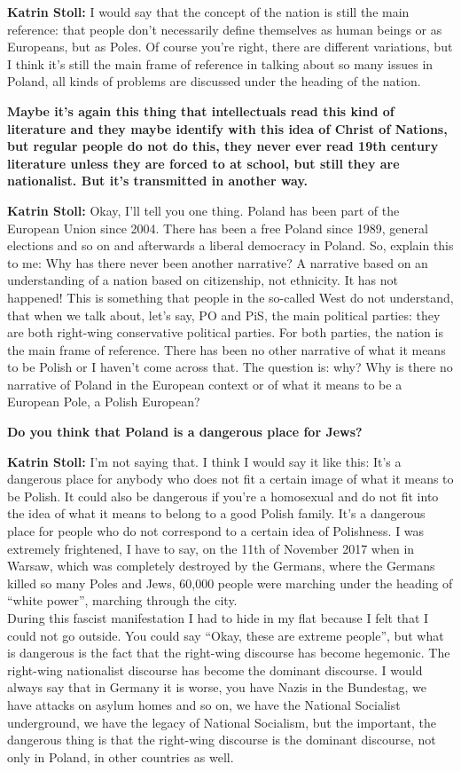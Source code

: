 \textbf{Katrin Stoll:} I would say that the concept of the nation is still the main reference: that people don’t necessarily define themselves as human beings or as Europeans, but as Poles. Of course you're right, there are different variations, but I think it’s still the main frame of reference in talking about so many issues in Poland, all kinds of problems are discussed under the heading of the nation. 

\textbf{Maybe it’s again this thing that intellectuals read this kind of literature and they maybe identify with this idea of Christ of Nations, but regular people do not do this, they never ever read 19th century literature unless they are forced to at school, but still they are nationalist. But it’s transmitted in another way.} 

\textbf{Katrin Stoll:} Okay, I’ll tell you one thing. Poland has been part of the European Union since 2004. There has been a free Poland since 1989, general elections and so on and afterwards a liberal democracy in Poland. So, explain this to me: Why has there never been another narrative? A narrative based on an understanding of a nation based on citizenship, not ethnicity. It has not happened! This is something that people in the so-called West do not understand, that when we talk about, let’s say, PO and PiS, the main political parties: they are both right-wing conservative political parties. For both parties, the nation is the main frame of reference. There has been no other narrative of what it means to be Polish or I haven’t come across that. The question is: why? Why is there no narrative of Poland in the European context or of what it means to be a European Pole, a Polish European? 

\textbf{Do you think that Poland is a dangerous place for Jews?}  
 
\textbf{Katrin Stoll:} I’m not saying that. I think I would say it like this: It’s a dangerous place for anybody who does not fit a certain image of what it means to be Polish. It could also be dangerous if you’re a homosexual and do not fit into the idea of what it means to belong to a good Polish family. It’s a dangerous place for people who do not correspond to a certain idea of Polishness. I was extremely frightened, I have to say, on the 11th of November 2017 when in Warsaw, which was completely destroyed by the Germans, where the Germans killed so many Poles and Jews, 60,000 people were marching under the heading of ``white power'', marching through the city.\\
During this fascist manifestation I had to hide in my flat because I felt that I could not go outside. You could say ``Okay, these are extreme people'', but what is dangerous is the fact that the right-wing discourse has become hegemonic. The right-wing nationalist discourse has become the dominant discourse. I would always say that in Germany it is worse, you have Nazis in the Bundestag, we have attacks on asylum homes and so on, we have the National Socialist underground, we have the legacy of National Socialism, but the important, the dangerous thing is that the right-wing discourse is the dominant discourse, not only in Poland, in other countries as well.  


